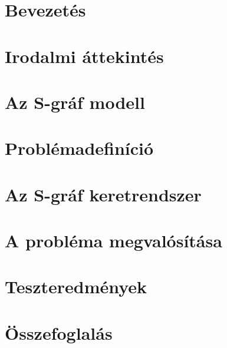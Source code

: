 \documentclass [12pt]{report}
\begin{document}

\tableofcontents
\thispagestyle{empty}


\chapter{Bevezetés}
\setcounter{page}{1}
\chapter{Irodalmi áttekintés}
\chapter{Az S-gráf modell}
\chapter{Problémadefiníció}
\chapter{Az S-gráf keretrendszer}
\chapter{A probléma megvalósítása}
\chapter{Teszteredmények}
\chapter{Összefoglalás}
\end{document}
